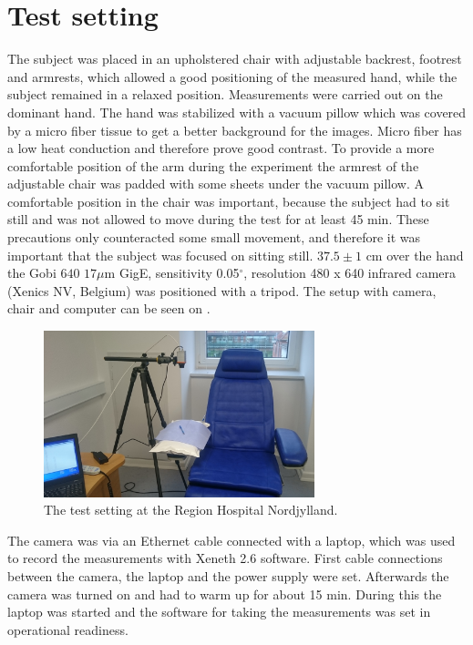 \section{Test setting}

The subject was placed in an upholstered chair with adjustable backrest, footrest and armrests, which allowed a good positioning of the measured hand, while the subject remained in a relaxed position. Measurements were carried out on the dominant hand. The hand was stabilized with a vacuum pillow which was covered by a micro fiber tissue to get a better background for the images. Micro fiber has a low heat conduction and therefore prove good contrast\cite{schacher2000}. To provide a more comfortable position of the arm during the experiment the armrest of the adjustable chair was padded with some sheets under the vacuum pillow. A comfortable position in the chair was important, because the subject had to sit still and was not allowed to move during the test for at least 45 min. These precautions only counteracted some small movement, and therefore it was important that the subject was focused on sitting still. 
$37.5\pm 1$ cm over the hand the Gobi $640$ $17\mu$m GigE, sensitivity 0.05$^\circ$, resolution 480 x 640 infrared camera (Xenics NV, Belgium) was positioned with a tripod\cite{xenics2012}. The setup with camera, chair and computer can be seen on . 


\begin{figure}[H]
	\includegraphics[width=0.7\textwidth]{figures/setting}
	\caption{The test setting at the Region Hospital Nordjylland.}
	\label{fig:setting}
\end{figure}

The camera was via an Ethernet cable connected with a laptop, which was used to record the measurements with Xeneth 2.6 software. 
First cable connections between the camera, the laptop and the power supply were set. Afterwards the camera was turned on and had to warm up for about 15 min\cite{xenics2012}. During this the laptop was started and the software for taking the measurements was set in operational readiness.

